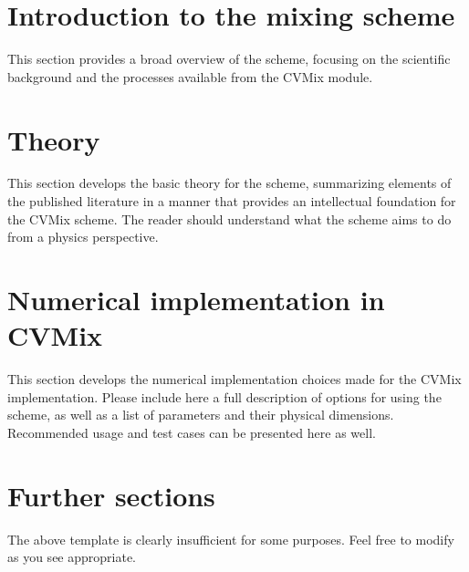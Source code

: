\section{Introduction to the mixing scheme}
\label{section:intro_new_scheme}

This section provides a broad overview of the scheme, focusing on the
scientific background and the processes available from the CVMix
module.  


\section{Theory}
\label{section:theory_new_scheme}

This section develops the basic theory for the scheme, summarizing
elements of the published literature in a manner that provides an
intellectual foundation for the CVMix scheme.  The reader should
understand what the scheme aims to do from a physics perspective.  

\section{Numerical implementation in CVMix}
\label{section:numerics_new_scheme}

This section develops the numerical implementation choices made for
the CVMix implementation.  Please include here a full description of
options for using the scheme, as well as a list of parameters and
their physical dimensions.  Recommended usage and test cases can be
presented here as well.  


\section{Further sections}

The above template is clearly insufficient for some purposes.  Feel
free to modify as you see appropriate.  


